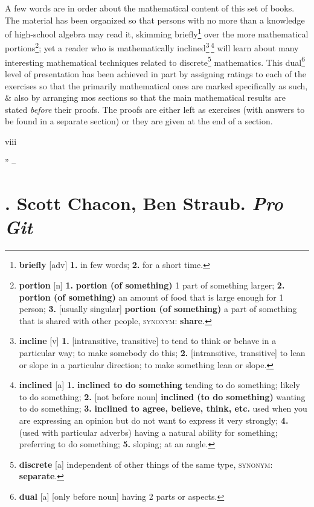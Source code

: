 \documentclass[oneside]{book}
\numberwithin{equation}{section}
\begin{document}
A few words are in order about the mathematical content of this set of books. The material has been organized so that persons with no more than a knowledge of high-school algebra may read it, skimming briefly\footnote{\textbf{briefly} [adv] \textbf{1.} in few words; \textbf{2.} for a short time.} over the more mathematical portions\footnote{\textbf{portion} [n] \textbf{1.} \textbf{portion (of something)} 1 part of something larger; \textbf{2.} \textbf{portion (of something)} an amount of food that is large enough for 1 person; \textbf{3.} [usually singular] \textbf{portion (of something)} a part of something that is shared with other people, \textsc{synonym}: \textbf{share}.}; yet a reader who is mathematically inclined\footnote{\textbf{incline} [v] \textbf{1.} [intransitive, transitive] to tend to think or behave in a particular way; to make somebody do this; \textbf{2.} [intransitive, transitive] to lean or slope in a particular direction; to make something lean or slope.}\,\footnote{\textbf{inclined} [a] \textbf{1.} \textbf{inclined to do something} tending to do something; likely to do something; \textbf{2.} [not before noun] \textbf{inclined (to do something)} wanting to do something; \textbf{3.} \textbf{inclined to agree, believe, think, etc.} used when you are expressing an opinion but do not want to express it very strongly; \textbf{4.} (used with particular adverbs) having a natural ability for something; preferring to do something; \textbf{5.} sloping; at an angle.} will learn about many interesting mathematical techniques related to discrete\footnote{\textbf{discrete} [a] independent of other things of the same type, \textsc{synonym}: \textbf{separate}.} mathematics. This dual\footnote{\textbf{dual} [a] [only before noun] having 2 parts or aspects.} level of presentation has been achieved in part by assigning ratings to each of the exercises so that the primarily mathematical ones are marked specifically as such, \& also by arranging mos sections so that the main mathematical results are stated \textit{before} their proofs. The proofs are either left as exercises (with answers to be found in a separate section) or they are given at the end of a section.

viii

'' -- \cite[Preface, pp. v--]{Knuth1997}


\chapter{\cite{Chacon_Straub2014}. Scott Chacon, Ben Straub. \textit{Pro Git}}
\end{document}
